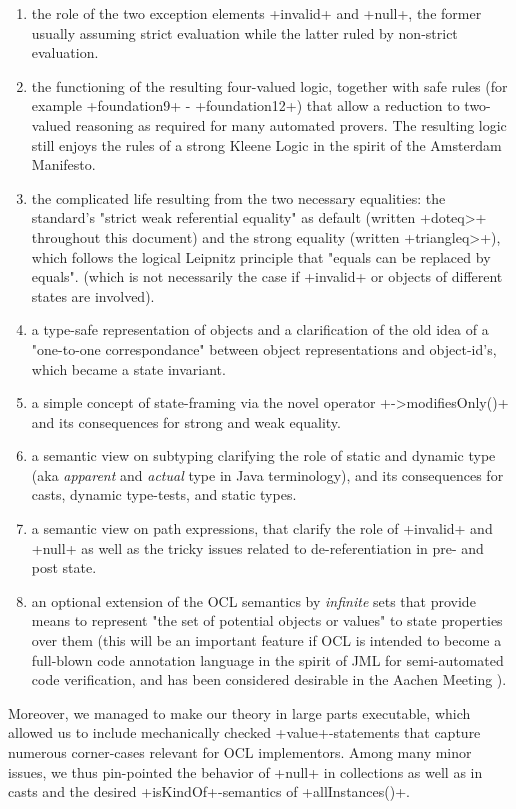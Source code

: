 \begin{enumerate}
\item the role of the two exception elements \inlineisar+invalid+
      and \inlineisar+null+, the former usually assuming strict evaluation
      while the latter ruled by non-strict evaluation.
\item the functioning of the resulting four-valued logic,
      together with safe rules (for example \inlineisar+foundation9+ - 
      \inlineisar+foundation12+) that allow a reduction
      to two-valued reasoning as required for many automated
      provers. The resulting logic still enjoys the rules of a 
      strong Kleene Logic in the spirit of the Amsterdam Manifesto.
\item the complicated life resulting from the two necessary equalities:
      the standard's "strict weak referential equality" as default 
      (written \inlineisar+\<doteq>+ throughout this document) and
      the strong equality (written \inlineisar+\<triangleq>+), which follows
      the logical Leipnitz principle that "equals can be replaced by equals".
      (which is not necessarily the case if \inlineisar+invalid+ 
       or objects of different states are involved).
\item a type-safe representation of objects and a clarification of
      the old idea of a "one-to-one correspondance" between object
      representations and object-id's, which became a state invariant.
\item a simple concept of state-framing via the novel operator 
      \inlineisar+->modifiesOnly()+ and its consequences for strong 
      and weak equality.
\item a semantic view on subtyping clarifying the role of static and dynamic type
      (aka \emph{apparent} and \emph{actual} type in Java terminology), and its 
      consequences for casts, dynamic type-tests, and static types.
\item a semantic view on path expressions, that clarify the role of
      \inlineisar+invalid+ and \inlineisar+null+ as well as the tricky 
      issues related to de-referentiation in pre- and post state.
\item an optional extension of the OCL semantics by \emph{infinite} sets
      that provide means to represent "the set of potential objects or values"
      to state properties over them (this will be an important feature if
      OCL is intended to become a full-blown code annotation language in
      the spirit of JML for semi-automated code verification, and has
      been considered desirable in the Aachen Meeting ).
\end{enumerate}      
Moreover, we managed to make our theory in large parts executable, which allowed
us to include mechanically checked \inlineisar+value+-statements 
that capture numerous corner-cases relevant for OCL implementors. Among many minor
issues, we thus pin-pointed the behavior of \inlineisar+null+ in collections as
well as in casts and the desired \inlineisar+isKindOf+-semantics of 
\inlineisar+allInstances()+.


